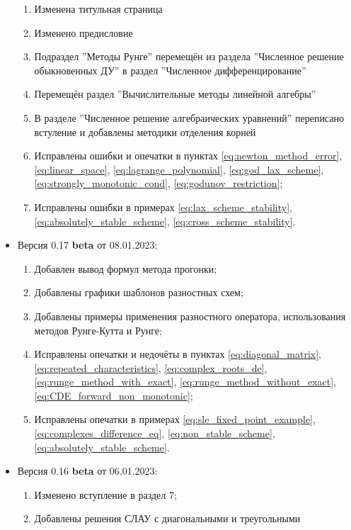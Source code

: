 \documentclass{article}
\begin{document}
\begin{itemize}[nosep]
	\begin{enumerate}[nosep]
		\item Изменена титульная страница
		\item Изменено предисловие
		\item Подраздел ''Методы Рунге'' перемещён из раздела
			''Численное решение обыкновенных ДУ'' в раздел
			''Численное дифференцирование''
		\item Перемещён раздел ''Вычислительные методы линейной
			алгебры''
		\item В разделе ''Численное решение алгебраических уравнений''
			переписано встуление и добавлены методики отделения
			корней
		\item Исправлены ошибки и опечатки в пунктах
			\eqref{eq:newton_method_error},
			\eqref{eq:linear_space},
			\eqref{eq:lagrange_polynomial}, 
			\eqref{eq:god_lax_scheme},
			\eqref{eq:strongly_monotonic_cond},
			\eqref{eq:godunov_restriction};
		\item Исправлены ошибки в примерах
			\eqref{eq:lax_scheme_stability},
			\eqref{eq:absolutely_stable_scheme},
			\eqref{eq:cross_scheme_stability}.
	\end{enumerate}
\item Версия 0.17 \textbf{beta} от 08.01.2023:
	\begin{enumerate}[nosep]
		\item Добавлен вывод формул метода прогонки;
		\item Добавлены графики шаблонов разностных схем;
		\item Добавлены примеры применения разностного оператора,
			использования методов Рунге-Кутта и Рунге;
		\item Исправлены опечатки и недочёты в пунктах
			\eqref{eq:diagonal_matrix},
			\eqref{eq:repeated_characteristics},
			\eqref{eq:complex_roots_de},
			\eqref{eq:runge_method_with_exact},
			\eqref{eq:runge_method_without_exact},
			\eqref{eq:CDE_forward_non_monotonic};
		\item Исправлены опечатки в примерах
			\eqref{eq:sle_fixed_point_example},
			\eqref{eq:complexes_difference_eq},
			\eqref{eq:non_stable_scheme},
			\eqref{eq:absolutely_stable_scheme}.
	\end{enumerate}
\item Версия 0.16 \textbf{beta} от 06.01.2023:
	\begin{enumerate}[nosep]
		\item Изменено вступление в раздел 7;
		\item Добавлены решения СЛАУ с диагональными и треугольными

\end{enumerate}
\end{itemize}
\end{document}
